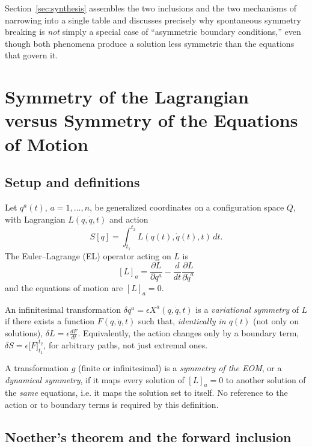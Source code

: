 Section~\ref{sec:synthesis} assembles the two inclusions and the two mechanisms
of narrowing into a single table and discusses precisely why spontaneous
symmetry breaking is \emph{not} simply a special case of ``asymmetric boundary
conditions,'' even though both phenomena produce a solution less symmetric than
the equations that govern it.

\section{Symmetry of the Lagrangian versus Symmetry of the Equations of Motion}
\label{sec:LvsEOM}

\subsection{Setup and definitions}

Let $q^a(t)$, $a=1,\dots,n$, be generalized coordinates on a configuration
space $Q$, with Lagrangian $L(q,\dot q,t)$ and action
\[
S[q] = \int_{t_1}^{t_2} L(q(t),\dot q(t),t)\,dt .
\]
The Euler--Lagrange (EL) operator acting on $L$ is
\[
[L]_a = \frac{\partial L}{\partial q^a} - \frac{d}{dt}\frac{\partial L}{\partial \dot q^a}
\]
and the equations of motion are $[L]_a=0$.

\begin{definition}
An infinitesimal transformation $\delta q^a = \epsilon X^a(q,\dot q,t)$ is a \emph{variational symmetry} of $L$ if there exists a function $F(q,\dot q,t)$ such that, \emph{identically in $q(t)$} (not only on solutions), $ \delta L=\epsilon \tfrac{dF}{dt}$.
Equivalently, the action changes only by a boundary term, $\delta S = \epsilon\big[F\big]_{t_1}^{t_2}$, for arbitrary paths, not just extremal ones.
\end{definition}

\begin{definition}
A transformation $g$ (finite or infinitesimal) is a \emph{symmetry of the EOM}, or a \emph{dynamical symmetry}, if it maps every solution of $[L]_a=0$ to another solution of the \emph{same} equations, i.e. it maps the solution set to itself. No reference to the action or to boundary terms is required by this definition.
\end{definition}

\subsection{Noether's theorem and the forward inclusion}

